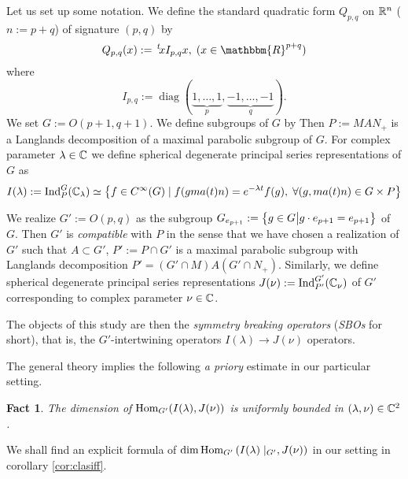\documentclass[12pt]{article} %
\newcommand{\assign}{:=}
\newcommand{\tmop}[1]{\ensuremath{\operatorname{#1}}}
\newcommand{\Hom}{\mbox{\normalfont Hom}}
\newcommand{\Ind}{\mbox{\normalfont Ind}}
\newtheorem{fact}{Fact}
\theoremstyle{definition}
\theoremstyle{exampstyle} \newtheorem{examp}[theorem]{Theorem}
\renewcommand{\Q}{Q_{p,q}}
\begin{document}
  \begin{versiona}
	  Let us set up some notation. We define the standard quadratic form
	  $\Q$ on $\mathbb{R}^n$ ($n:=p+q$) of signature $(p,q)$ by
	  \begin{equation*}
  \Q (x) \assign \,^t \! x I_{p, q} x, \; (x \in
  \mathbbm{R}^{p + q}) 
	  \end{equation*}
	  where
\begin{equation*}
   I_{p, q} \assign \tmop{diag} (\underbrace{1, \ldots, 1}_p, \underbrace{-
  1, \ldots, - 1}_q).
\end{equation*}
We set $G \assign O (p +
1, q + 1)$. We define subgroups of $G$ by
Then $P:=MAN_{+}$ is a Langlands decomposition of a maximal parabolic subgroup of $G$.
For complex parameter $\lambda\in\mathbb{C}$ we define spherical degenerate principal series representations of $G$ as
\begin{equation*}
I(\lambda):=\Ind_P^G(\C_\lambda)\simeq \left\{ f\in C^{\infty}(G)\mid f(gma(t)n)=e^{-\lambda t}f(g),\;\forall(g,ma(t)n)\in G\times P \right\}
\end{equation*}

We realize $G':=O(p,q)$ as the subgroup $G_{e_{p+1}}:=\left\{g \in G\big| g \cdot e_{p + 1} = e_{p + 1}\right\}$ of $G$. 
Then $G'$ is {\it compatible} with $P$ in the sense that we have chosen a realization of $G'$ such that $A\subset G'$,
 $P':=P\cap G'$ is a maximal parabolic subgroup
with Langlands decomposition $P'=(G'\cap M)A (G'\cap N_+)$. Similarly, we define spherical degenerate principal series representations $J(\nu):=\Ind_{P'}^{G'}(\C_{\nu})$ of $G'$ corresponding to complex parameter $\nu\in\mathbb{C}$.

The objects of this study are then the \textit{symmetry breaking operators} (\textit{SBOs} for short),
that is, the $G'$-intertwining operators $I(\lambda)\to J(\nu)$ operators.

The general theory \cite{kobayashi2014classification,kobayashi2013finite} implies the following {\it a priory} estimate in our particular setting.
\begin{fact}
	The dimension of $\Hom_{G'}(I(\lambda),J(\nu))$ is uniformly bounded in $(\lambda,\nu)\in\mathbb{C}^2$.
\end{fact}
We shall find an explicit formula of $\dim\Hom_{G'}\left( I(\lambda)\mid_{G'},J(\nu) \right)$ in our setting in corollary \ref{cor:clasiff}.


\end{versiona}
\end{document}

